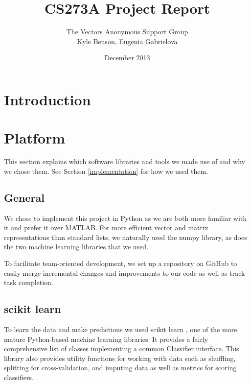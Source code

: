 \documentclass{article}
\title{CS273A Project Report}
\author{The Vectors Anonymous Support Group\\Kyle Benson, Eugenia Gabrielova}
\date{December 2013}
\begin{document}
\maketitle



\section{Introduction}



\section{Platform}

This section explains which software libraries and tools we made use of and why we chose them.
See Section \ref{implementation} for how we used them.

\subsection{General}
We chose to implement this project in Python as we are both more familiar with it and prefer it over MATLAB\textregistered.
For more efficient vector and matrix representations than standard lists, we naturally used the numpy library, as does the two machine learning libraries that we used.

To facilitate team-oriented development, we set up a repository on GitHub to easily merge incremental changes and improvements to our code as well as track task completion.

\subsection{scikit learn}


To learn the data and make predictions we used scikit learn \cite{pedregosa2011scikit}, one of the more mature Python-based machine learning libraries.
It provides a fairly comprehensive list of classes implementing a common Classifier interface.
This library also provides utility functions for working with data such as shuffling, splitting for cross-validation, and imputing data as well as metrics for scoring classifiers.
\end{document}
